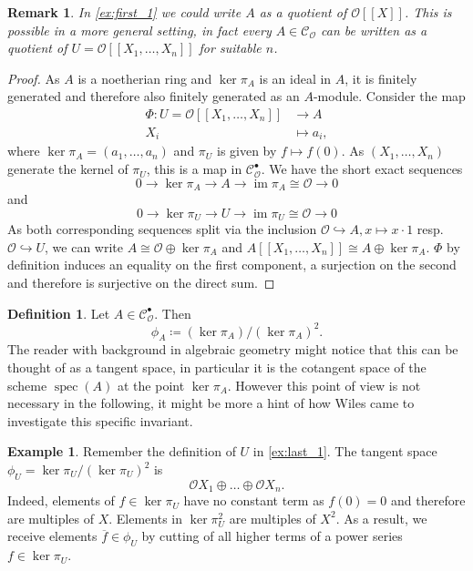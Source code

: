 \documentclass{article}
\theoremstyle{plain}%
\newtheorem{remark}{Remark}[section]
\theoremstyle{definition}
\newtheorem{definition}{Definition}[section]
\newtheorem{example}{Example}[section]
\theoremstyle{remark}
\newcommand{\cob}{\mathcal{C}_\mathcal{O}^\bullet}
\newcommand{\co}{\mathcal{C}_\mathcal{O}}
\newcommand{\im}{\operatorname{im}}
\begin{document}
\begin{remark}\label{rem:quotientofU}
    In \cref{ex:first_1} we could write \(A\) as a quotient of \(\mathcal{O}[[X]]\). 
    This is possible in a more general setting, in fact every \(A \in \co\) can be written as a quotient of
    \(U = \mathcal{O}[[X_1, \dots, X_n]]\) for suitable \(n\).
\end{remark}
\begin{proof}
    As \(A\) is a noetherian ring and \(\ker \pi_A\) is an ideal in \(A\), it is finitely generated 
    and therefore also finitely generated as an \(A\)-module. Consider the map
    \begin{align*}
        \Phi\colon U = \mathcal{O}[[X_1, \dots, X_n]] &\to A\\
        X_i &\mapsto a_i,
    \end{align*}
    where \(\ker \pi_A = (a_1, \dots, a_n)\) and \(\pi_U\) is given by \(f \mapsto f(0)\). 
    As \((X_1, \dots, X_n)\) generate the kernel of \(\pi_U\), this is a map in \(\cob\).
    We have the short exact sequences
    \[
        0 \to \ker \pi_A \to A \to \im \pi_A \cong \mathcal{O} \to 0
    \]
    and
    \[
        0 \to \ker \pi_U \to U \to \im \pi_U \cong \mathcal{O} \to 0
    \]
    As both corresponding sequences split via the inclusion \(\mathcal{O} \hookrightarrow A, x \mapsto x \cdot 1\)
    resp. \(\mathcal{O} \hookrightarrow U\), we can write \(A \cong \mathcal{O} \oplus \ker \pi_A\) 
    and \(A[[X_1, \dots, X_n]] \cong A \oplus \ker \pi_A\).
    \(\Phi\) by definition induces an equality on the first component, 
    a surjection on the second and therefore is surjective on the direct sum.
\end{proof}

\begin{definition}
    Let \(A \in \cob\). Then
    \[\phi_A \coloneqq (\ker \pi_A)/(\ker \pi_A)^2.\]
    The reader with background in algebraic geometry might notice that this can be thought of as a tangent space, 
    in particular it is the cotangent space of the scheme \(\operatorname{spec}(A)\) at the point \(\ker \pi_A\).
    However this point of view is not necessary in the following, 
    it might be more a hint of how Wiles came to investigate this specific invariant.
\end{definition}

\begin{example}\label{ex:last_phi}
    Remember the definition of \(U\) in \cref{ex:last_1}.
    The tangent space \(\phi_U = \ker \pi_U/(\ker \pi_U)^2\) is
    \[
        \mathcal{O}X_1 \oplus \dots \oplus \mathcal{O}X_n.
    \]
    Indeed, elements of \(f \in \ker \pi_U\) have no constant term as \(f(0) = 0\) and therefore are multiples of \(X\).
    Elements in \(\ker \pi_U^2\) are multiples of \(X^2\). As a result, we receive elements \(\overline{f} \in \phi_U\) by
    cutting of all higher terms of a power series \(f \in \ker \pi_U\).
\end{example}
\end{document}
